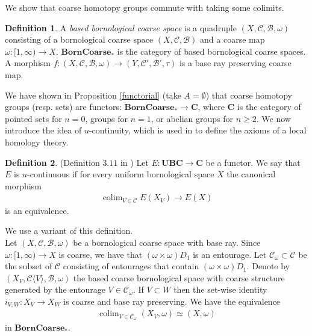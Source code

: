\documentclass[a4paper,11pt]{article}
\theoremstyle{definition}
\newtheorem{definition}{Definition}[section]
\theoremstyle{plain}
\theoremstyle{remark}
\DeclareMathOperator{\colim}{colim}
\begin{document}
We show that coarse homotopy groups commute with taking some colimits. 

\begin{definition} A \textit{based bornological coarse space} is a quadruple  $(X,\mathcal{C},\mathcal{B},\omega)$ consisting of a bornological coarse space $(X,\mathcal{C},\mathcal{B})$ and a coarse map $\omega: [1,\infty)\rightarrow X$. 
$\textbf{BornCoarse}_{*}$ is the category of based bornological coarse spaces. A morphism $f: (X,\mathcal{C},\mathcal{B},\omega) \rightarrow  (Y,\mathcal{C}',\mathcal{B}',\tau)$ is a base ray preserving coarse map. 
\end{definition}

We have shown in Proposition \ref{functorial} (take $A=\emptyset$) that coarse homotopy groups (resp. sets) are functors: $\textbf{BornCoarse}_{*}\rightarrow \mathbf{C}$, where $\mathbf{C}$ is the category of pointed sets for $n=0$, groups for $n=1$, or abelian groups for $n\geq 2$. We now introduce the idea of $u$-continuity, which is used in \cite{bunke2020coarse} to define the axioms of a local homology theory.

\begin{definition}(Definition $3.11$ in \cite{bunke2020coarse}) Let $E:\mathbf{UBC}\rightarrow \mathbf{C}$ be a functor. We say that $E$ is $u$-continuous if for every uniform bornological space $X$ the canonical morphism
\begin{align*} 
\colim_{V\in \mathcal{C}} E(X_{V})\rightarrow E(X)
\end{align*} is an equivalence. 
\end{definition}

We use a variant of this definition.\\

Let $(X,\mathcal{C},\mathcal{B},\omega)$ be a bornological coarse space with base ray. Since $\omega: [1,\infty) \rightarrow X$ is coarse, we have that $(\omega \times \omega)D_{1}$ is an entourage. Let $\mathcal{C}_{\omega}\subset \mathcal{C}$ be the subset of $\mathcal{C}$ consisting of entourages that contain $(\omega \times \omega)D_{1}$. Denote by $(X_{V}, \mathcal{C}\langle V\rangle, \mathcal{B},\omega)$ the based coarse bornological space with coarse structure generated by the entourage $V\in \mathcal{C}_{\omega}$. If $V\subset W$ then the set-wise identity $i_{V,W}:X_{V}\rightarrow X_{W}$ is coarse and base ray preserving. We have the equivalence 
\begin{align*}
\colim_{V \in \mathcal{C}_{\omega}} (X_{V},\omega) \simeq (X,\omega)
\end{align*}
in $\textbf{BornCoarse}_{*}$.
\end{document}

